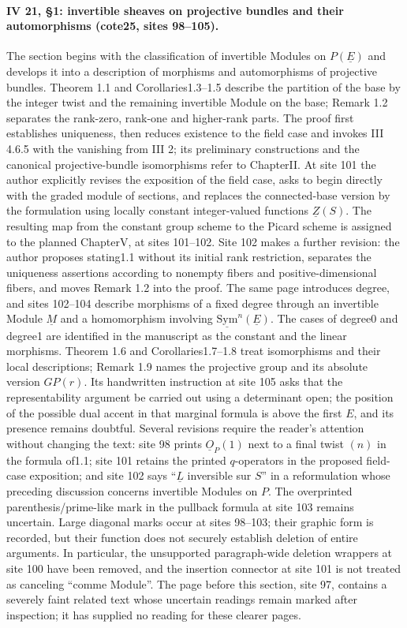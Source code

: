 \paragraph{IV 21, \S1: invertible sheaves on projective bundles and their automorphisms (cote25, sites 98--105).}
The section begins with the classification of invertible Modules on $P(\underline E)$ and develops it into a description of morphisms and automorphisms of projective bundles. Theorem 1.1 and Corollaries1.3--1.5 describe the partition of the base by the integer twist and the remaining invertible Module on the base; Remark 1.2 separates the rank-zero, rank-one and higher-rank parts. The proof first establishes uniqueness, then reduces existence to the field case and invokes III 4.6.5 with the vanishing from III 2; its preliminary constructions and the canonical projective-bundle isomorphisms refer to ChapterII. At site 101 the author explicitly revises the exposition of the field case, asks to begin directly with the graded module of sections, and replaces the connected-base version by the formulation using locally constant integer-valued functions $\underline Z(S)$. The resulting map from the constant group scheme to the Picard scheme is assigned to the planned ChapterV, at sites 101--102. Site 102 makes a further revision: the author proposes stating1.1 without its initial rank restriction, separates the uniqueness assertions according to nonempty fibers and positive-dimensional fibers, and moves Remark 1.2 into the proof. The same page introduces degree, and sites 102--104 describe morphisms of a fixed degree through an invertible Module $\underline M$ and a homomorphism involving $\underline{\mathrm{Sym}}^n(\underline E)$. The cases of degree0 and degree1 are identified in the manuscript as the constant and the linear morphisms. Theorem 1.6 and Corollaries1.7--1.8 treat isomorphisms and their local descriptions; Remark 1.9 names the projective group and its absolute version $GP(r)$. Its handwritten instruction at site 105 asks that the representability argument be carried out using a determinant open; the position of the possible dual accent in that marginal formula is above the first $E$, and its presence remains doubtful. Several revisions require the reader's attention without changing the text: site 98 prints $\underline O_P(1)$ next to a final twist $(n)$ in the formula of1.1; site 101 retains the printed $q$-operators in the proposed field-case exposition; and site 102 says ``$\underline L$ inversible sur $S$'' in a reformulation whose preceding discussion concerns invertible Modules on $P$. The overprinted parenthesis/prime-like mark in the pullback formula at site 103 remains uncertain. Large diagonal marks occur at sites 98--103; their graphic form is recorded, but their function does not securely establish deletion of entire arguments. In particular, the unsupported paragraph-wide deletion wrappers at site 100 have been removed, and the insertion connector at site 101 is not treated as canceling ``comme Module''. The page before this section, site 97, contains a severely faint related text whose uncertain readings remain marked after inspection; it has supplied no reading for these clearer pages.
